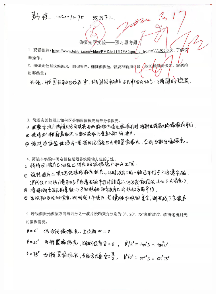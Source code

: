 \documentclass[UTF8]{ctexart}
\begin{document}
\begin{figure}[H]
  \centering
  \includegraphics[scale=0.13]{4.jpg}
\end{figure}
\end{document}
